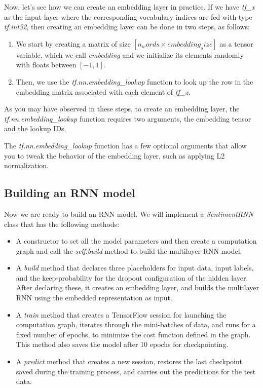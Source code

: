\documentclass[11pt]{article}
\providecommand{\tightlist}{%
      \setlength{\itemsep}{0pt}\setlength{\parskip}{0pt}}
\begin{document}
Now, let's see how we can create an embedding layer in practice. If we
have \emph{tf\_x} as the input layer where the corresponding vocabulary
indices are fed with type \emph{tf.int32}, then creating an embedding
layer can be done in two steps, as follows:

\begin{enumerate}
\def\labelenumi{\arabic{enumi}.}
\tightlist
\item
  We start by creating a matrix of size
  \([n_words \times embedding_size]\) as a tensor variable, which we
  call \emph{embedding} and we initialize its elements randomly with
  floats between \([-1, 1]\).
\item
  Then, we use the \emph{tf.nn.embedding\_lookup} function to look up
  the row in the embedding matrix associated with each element of
  \emph{tf\_x}.
\end{enumerate}

As you may have observed in these steps, to create an embedding layer,
the \emph{tf.nn.embedding\_lookup} function requires two arguments, the
embedding tensor and the lookup IDs.

The \emph{tf.nn.embedding\_lookup} function has a few optional arguments
that allow you to tweak the behavior of the embedding layer, such as
applying L2 normalization.

    \subsection{Building an RNN model}\label{building-an-rnn-model}

    Now we are ready to build an RNN model. We will implement a
\emph{SentimentRNN} class that has the following methods:

\begin{itemize}
\tightlist
\item
  A constructor to set all the model parameters and then create a
  computation graph and call the \emph{self.build} method to build the
  multilayer RNN model.
\item
  A \emph{build} method that declares three placeholders for input data,
  input labels, and the keep-probability for the dropout configuration
  of the hidden layer. After declaring these, it creates an embedding
  layer, and builds the multilayer RNN using the embedded representation
  as input.
\item
  A \emph{train} method that creates a TensorFlow session for launching
  the computation graph, iterates through the mini-batches of data, and
  runs for a fixed number of epochs, to minimize the cost function
  defined in the graph. This method also saves the model after 10 epochs
  for checkpointing.
\item
  A \emph{predict} method that creates a new session, restores the last
  checkpoint saved during the training process, and carries out the
  predictions for the test data.
\end{itemize}
\end{document}
